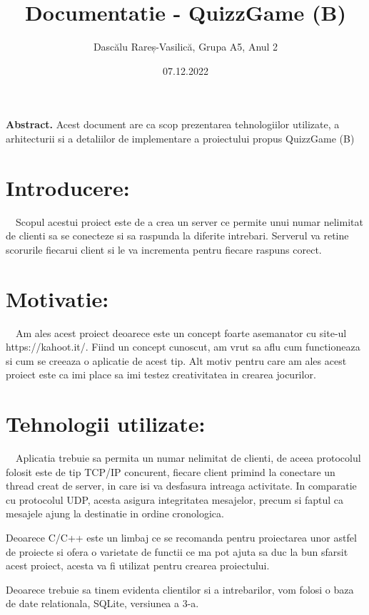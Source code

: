 \documentclass{article}
\title{Documentatie - QuizzGame (B)}
\author{Dascălu Rareș-Vasilică, Grupa A5, Anul 2}
\date{07.12.2022}
\begin{document}
\maketitle

\textbf{Abstract.} Acest document are ca scop prezentarea tehnologiilor utilizate, a arhitecturii si a detaliilor de implementare a proiectului propus QuizzGame (B)



\section*{Introducere:}

$\quad$Scopul acestui proiect este de a crea un server ce permite unui numar nelimitat de clienti sa se conecteze si sa raspunda la diferite intrebari. Serverul va retine scorurile fiecarui client si le va incrementa pentru fiecare raspuns corect. 

\section*{Motivatie:}

$\quad$Am ales acest proiect deoarece este un concept foarte asemanator cu site-ul https://kahoot.it/. Fiind un concept cunoscut, am vrut sa aflu cum functioneaza si cum se creeaza o aplicatie de acest tip. Alt motiv pentru care am ales acest proiect este ca imi place sa imi testez creativitatea in crearea jocurilor.

\section*{Tehnologii utilizate:}

$\quad$Aplicatia trebuie sa permita un numar nelimitat de clienti, de aceea protocolul folosit este de tip TCP/IP concurent, fiecare client primind la conectare un thread creat de server, in care isi va desfasura intreaga activitate. In comparatie cu protocolul UDP, acesta asigura integritatea mesajelor, precum si faptul ca mesajele ajung la destinatie in ordine cronologica.

Deoarece C/C++ este un limbaj ce se recomanda pentru proiectarea unor astfel de proiecte si ofera o varietate de functii ce ma pot ajuta sa duc la bun sfarsit acest proiect, acesta va fi utilizat pentru crearea proiectului.

Deoarece trebuie sa tinem evidenta clientilor si a intrebarilor, vom folosi o baza de date relationala, SQLite, versiunea a 3-a.
\end{document}

